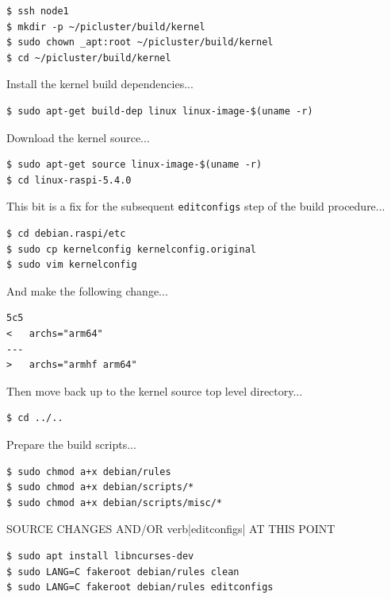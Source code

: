 \documentclass{report}
\begin{document}
\lstset{style=type}
\begin{lstlisting}
$ ssh node1
$ mkdir -p ~/picluster/build/kernel
$ sudo chown _apt:root ~/picluster/build/kernel
$ cd ~/picluster/build/kernel
\end{lstlisting}

Install the kernel build dependencies...

\lstset{style=type}
\begin{lstlisting}
$ sudo apt-get build-dep linux linux-image-$(uname -r)
\end{lstlisting}

Download the kernel source...

\lstset{style=type}
\begin{lstlisting}
$ sudo apt-get source linux-image-$(uname -r)
$ cd linux-raspi-5.4.0
\end{lstlisting}

This bit is a fix for the subsequent \verb|editconfigs| step of the build procedure...

\lstset{style=type}
\begin{lstlisting}
$ cd debian.raspi/etc
$ sudo cp kernelconfig kernelconfig.original
$ sudo vim kernelconfig
\end{lstlisting}

And make the following change...

\lstset{style=listing}
\begin{lstlisting}[caption=diff kernelconfig kernelconfig.original, numbers=none]
5c5
< 	archs="arm64"
---
> 	archs="armhf arm64"
\end{lstlisting}

Then move back up to the kernel source top level directory...

\lstset{style=type}
\begin{lstlisting}
$ cd ../..
\end{lstlisting}

Prepare the build scripts...

\lstset{style=type}
\begin{lstlisting}
$ sudo chmod a+x debian/rules
$ sudo chmod a+x debian/scripts/*
$ sudo chmod a+x debian/scripts/misc/*
\end{lstlisting}

SOURCE CHANGES AND/OR verb|editconfigs| AT THIS POINT

\lstset{style=type}
\begin{lstlisting}
$ sudo apt install libncurses-dev
$ sudo LANG=C fakeroot debian/rules clean
$ sudo LANG=C fakeroot debian/rules editconfigs
\end{lstlisting}
\end{document}
